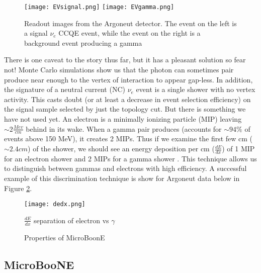 \documentclass[12pt]{article}
\begin{document}
\begin{figure}[h!]
\texttt{[image: EVsignal.png]}
\hspace{2 mm}
\texttt{[image: EVgamma.png]}
\caption{Readout images from the Argoneut detector. The event on the left is a signal $\nu_e$ CCQE event, while the event on the right is a background event producing a gamma} 
\label{fig:argoneut}
\end{figure}
\vspace{4 mm} \par There is one caveat to the story thus far, but it has a pleasant solution so fear not! Monte Carlo simulations show us that the photon can sometimes pair produce near enough to the vertex of interaction to appear gap-less. In addition, the signature of a neutral current (NC) $\nu_e$ event is a single shower with no vertex activity.  This casts doubt (or at least a decrease in event selection efficiency) on the signal sample selected by just the topology cut. But there is something we have not used yet.  An electron is a minimally ionizing particle (MIP) leaving $\sim 2 \frac{Mev}{cm}$ behind in its wake. When a gamma pair produces (accounts for $\sim 94\%$ of events above 150 MeV), it creates 2 MIPs.  Thus if we examine the first few cm ($\sim 2.4cm$) of the shower, we should see an energy deposition per cm ($\frac{dE}{dx}$) of 1 MIP for an electron shower and 2 MIPs for a gamma shower \cite{szelc}. This technique allows us to distinguish between gammas and electrons with high efficiency. A successful example of this discrimination technique is show for Argoneut data below in Figure \ref{fig:dedx}.
\begin{figure}[h!]
\centering
\texttt{[image: dedx.png]}
\caption{ $\frac{dE}{dx}$ separation of electron vs $\gamma$ \cite{szelc}} 
\label{fig:dedx}
\end{figure}

\begin{wrapfigure}{r}{0.3\textwidth}
\begin{center}

\end{center}
\caption{Properties of MicroBoonE}
\end{wrapfigure}

\color{black}
\subsection{MicroBooNE}
\end{document}
